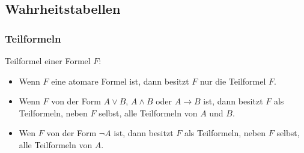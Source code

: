 \subsection{Wahrheitstabellen}
\begin{minipage}{0.9\linewidth}
\subsubsection{Teilformeln}%
\label{ssub:teilformeln}
	
Teilformel einer Formel $F$: \\
\begin{itemize}
 \item Wenn $F$ eine atomare Formel ist, dann besitzt $F$ nur die Teilformel $F$.
 \item Wenn $F$ von der Form $A \lor B$, $A \land B$ oder $A \rightarrow B$ ist, dann besitzt $F$ als Teilformeln, neben $F$ selbst, alle Teilformeln von
				$A$ und $B$.
 \item Wen $F$ von der Form $\neg A$ ist, dann besitzt $F$ als Teilformeln, neben $F$ selbst, alle Teilformeln von $A$.
\end{itemize}
\end{minipage}
